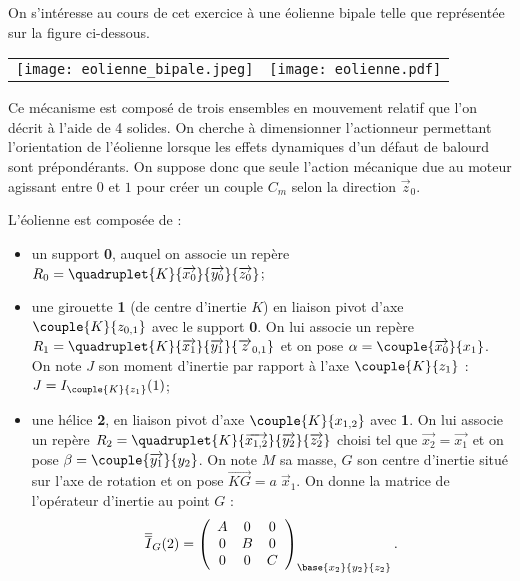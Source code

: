 \ifprof
\else
\begin{multicols}{2}
\fi

\ifprof
\else
On s'intéresse au cours de cet exercice à une éolienne bipale telle que représentée sur la figure ci-dessous. 
\begin{center}
\begin{tabular}{cc}
\texttt{[image: eolienne\_bipale.jpeg]}
&
\texttt{[image: eolienne.pdf]}
\end{tabular}
\end{center}

Ce mécanisme est composé de trois ensembles en mouvement relatif que l'on décrit à l'aide de 4 solides.%
On cherche à dimensionner l'actionneur permettant l'orientation de l'éolienne lorsque les effets dynamiques d'un défaut de balourd sont prépondérants. 
%
On suppose donc que seule l'action mécanique due au moteur agissant entre $0$ et $1$ pour créer un couple $C_m$ selon la direction $\overrightarrow{z}_0$. 

L'éolienne est composée de : 
\begin{itemize}
\item un support \textbf{0}, auquel on associe un repère $R_0=\quadruplet{K}{\overrightarrow{x_0}}{\overrightarrow{y_0}}{\overrightarrow{z_0}}$;
\item une girouette \textbf{1} (de centre d'inertie $K$) en liaison pivot d'axe $\couple{K}{{z}_{0,1}}$ avec le support \textbf{0}. On lui associe un repère $R_1=\quadruplet{K}{\overrightarrow{x_1}}{\overrightarrow{y_1}}{\overrightarrow{z}_{0,1}}$ et on pose $\alpha=\couple{\overrightarrow{x_0}}{{x}_1}$. On note $J$ son moment d'inertie par rapport à l'axe $\couple{K}{{z}_1}$ : $J=I_{\couple{K}{{z}_1}}(1)$;
\item une hélice \textbf{2}, en liaison pivot d'axe $\couple{K}{{x}_{1,2}}$  avec \textbf{1}. On lui associe un repère $R_2=\quadruplet{K}{\overrightarrow{x_{1,2}}}{\overrightarrow{y_2}}{\overrightarrow{z_2}}$  choisi tel que $\overrightarrow{x_2}=\overrightarrow{x_1}$ et on pose $\beta=\couple{\overrightarrow{y_1}}{{y}_2}$.
On note $M$ sa masse, $G$ son centre d'inertie situé sur l'axe de rotation et on pose $\overrightarrow{KG}=a\;\overrightarrow{x}_1$. On donne la matrice de l'opérateur d'inertie au point $G$ :
\begin{align*}
\overline{\overline{I}}_G(2)=
\left(
\begin{array}{ccc}
A & 0 & 0 \\ 
0 & B & 0 \\ 
0 & 0 & C
\end{array}
\right)_{\base{{x}_2}{{y}_2}{{z}_2}}.
\end{align*}
 


\end{itemize}
\end{multicols}
